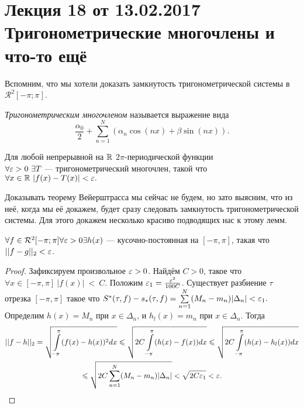 \section{Лекция 18 от 13.02.2017 \\ Тригонометрические многочлены и что-то ещё}
Вспомним, что мы хотели доказать замкнутость тригонометрической системы в $\mathcal{R}^2[-\pi;\pi]$.
\begin{Def}
\textit{Тригонометрическим многочленом} называется выражение вида
$$
\frac{\alpha_0}{2} + \sum\limits_{n = 1}^N\left(\alpha_n \cos(nx) +\beta \sin(nx)\right).
$$
\end{Def}
\begin{Theorem}[Вейерштрасса]
    Для любой непрерывной на $\mathbb{R}$ $2\pi$-периодической функции \\$\forall \varepsilon>0\  \exists T$ --- тригонометрический многочлен, такой что $\forall x \in \mathbb{R} \ |f(x)-T(x)|<\varepsilon.$
\end{Theorem}
Доказывать теорему Вейерштрасса мы сейчас не будем, но зато выясним, что из неё, когда мы её докажем, будет сразу следовать замкнутость тригонометрической системы. Для этого докажем несколько красиво подводящих нас к этому лемм.

\begin{Lemma}
   $\forall f \in \mathcal{R}^2[-\pi;\pi] \forall \varepsilon > 0 \exists h(x)$ --- кусочно-постоянная на $[-\pi, \pi]$, такая что $||f-g||_2 < \varepsilon$.
\end{Lemma}
\begin{proof}
    Зафиксируем произвольное $\varepsilon >0$. Найдём $C>0$, такое что $\forall x \in [-\pi, \pi]\ |f(x)|~<~C$. Положим $\varepsilon_1 = \frac{\varepsilon^2}{100C}$. Существует разбиение  $\tau$ отрезка $[-\pi, \pi]$ такое что $S^*(\tau, f)- s_*(\tau, f) = \sum\limits_{n=1}^N (M_n-m_n)|\Delta_n|< \varepsilon_1.$\\
    Определим $h(x) = M_n$ при $x \in \Delta_n$, и $h_l(x) = m_n$ при $x \in \Delta_n$. Тогда 
     \begin{multline} ||f-h||_2 = \sqrt{\int\limits_{-\pi}^{\pi}(f(x)-h(x))^2dx} \leqslant \sqrt{2C\int\limits_{-\pi}^{\pi}(h(x)-f(x))dx} \leqslant \sqrt{2C\int\limits_{-\pi}^{\pi}(h(x)-h_l(x))dx}\\ \leqslant \sqrt{2C\sum\limits_{n=1}^N (M_n-m_n)|\Delta_n|} < \sqrt{2C\varepsilon_1} < \varepsilon. \end{multline}
\end{proof}


